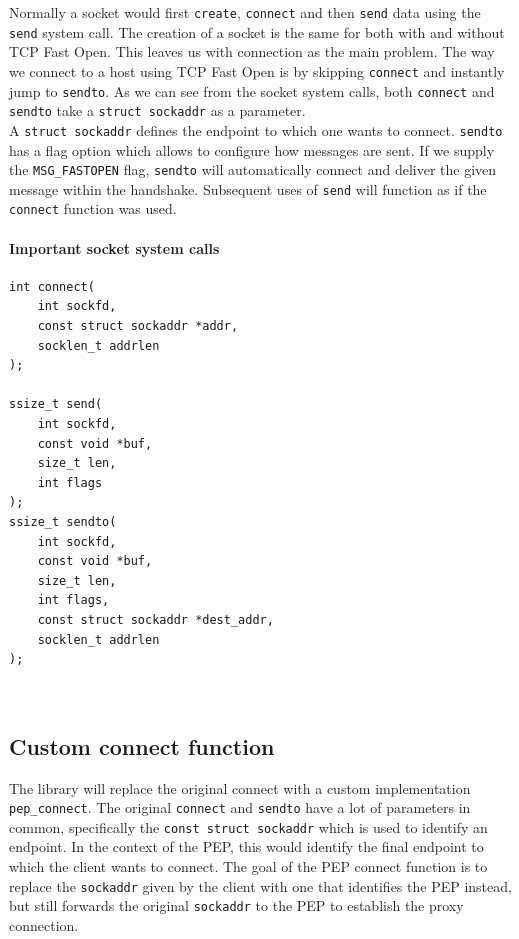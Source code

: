\documentclass[a4paper,english, 11pt]{report}
\begin{document}
Normally a socket would first \verb|create|, \verb|connect| and then \verb|send| data using the \verb|send| system call. The creation of a socket is the same for both with and without TCP Fast Open. This leaves us with connection as the main problem. The way we connect to a host using TCP Fast Open is by skipping \verb|connect| and instantly jump to \verb|sendto|. As we can see from the socket system calls, both \verb|connect| and \verb|sendto| take a \verb|struct sockaddr| as a parameter.\\

A \verb|struct sockaddr| defines the endpoint to which one wants to connect. \verb|sendto| has a flag option which allows to configure how messages are sent. If we supply the \verb|MSG_FASTOPEN| flag, \verb|sendto| will automatically connect and deliver the given message within the handshake. Subsequent uses of \verb|send| will function as if the \verb|connect| function was used.\\

\noindent\begin{minipage}{\linewidth}
\paragraph{Important socket system calls}
\begin{verbatim}
int connect(
    int sockfd,
    const struct sockaddr *addr,
    socklen_t addrlen
);

ssize_t send(
    int sockfd,
    const void *buf,
    size_t len,
    int flags
);
ssize_t sendto(
    int sockfd,
    const void *buf,
    size_t len,
    int flags,
    const struct sockaddr *dest_addr,
    socklen_t addrlen
);
\end{verbatim}
\end{minipage}\\


\subsection{Custom connect function}
The library will replace the original connect with a custom implementation \verb|pep_connect|. The original \verb|connect| and \verb|sendto| have a lot of parameters in common, specifically the \verb|const struct sockaddr| which is used to identify an endpoint. In the context of the PEP, this would identify the final endpoint to which the client wants to connect. The goal of the PEP connect function is to replace the \verb|sockaddr| given by the client with one that identifies the PEP instead, but still forwards the original \verb|sockaddr| to the PEP to establish the proxy connection.\\
\end{document}
